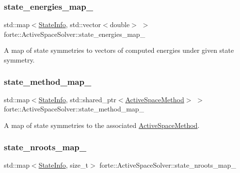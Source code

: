 \subsubsection{\texorpdfstring{state\+\_\+energies\+\_\+map\+\_\+}{state\_energies\_map\_}}
{\footnotesize\ttfamily std\+::map$<$\mbox{\hyperlink{classforte_1_1_state_info}{State\+Info}}, std\+::vector$<$double$>$ $>$ forte\+::\+Active\+Space\+Solver\+::state\+\_\+energies\+\_\+map\+\_\+\hspace{0.3cm}{\ttfamily [protected]}}



A map of state symmetries to vectors of computed energies under given state symmetry. 

\mbox{\label{classforte_1_1_active_space_solver_a0f0a070d97a0ccf46e2c4103eaecf416}} 
\subsubsection{\texorpdfstring{state\+\_\+method\+\_\+map\+\_\+}{state\_method\_map\_}}
{\footnotesize\ttfamily std\+::map$<$\mbox{\hyperlink{classforte_1_1_state_info}{State\+Info}}, std\+::shared\+\_\+ptr$<$\mbox{\hyperlink{classforte_1_1_active_space_method}{Active\+Space\+Method}}$>$ $>$ forte\+::\+Active\+Space\+Solver\+::state\+\_\+method\+\_\+map\+\_\+\hspace{0.3cm}{\ttfamily [protected]}}



A map of state symmetries to the associated \mbox{\hyperlink{classforte_1_1_active_space_method}{Active\+Space\+Method}}. 

\mbox{\label{classforte_1_1_active_space_solver_ad97b0a6e07f38da9e7f32632bdec95bb}} 
\subsubsection{\texorpdfstring{state\+\_\+nroots\+\_\+map\+\_\+}{state\_nroots\_map\_}}
{\footnotesize\ttfamily std\+::map$<$\mbox{\hyperlink{classforte_1_1_state_info}{State\+Info}}, size\+\_\+t$>$ forte\+::\+Active\+Space\+Solver\+::state\+\_\+nroots\+\_\+map\+\_\+\hspace{0.3cm}{\ttfamily [protected]}}

